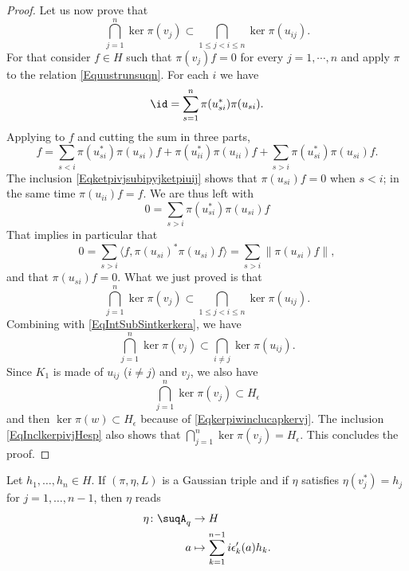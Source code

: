 \begin{proof}
    Let us now prove that
    \begin{equation}
        \bigcap_{j=1}^n\ker\pi(v_j)\subset\bigcap_{1\leq j<i\leq n}\ker\pi(u_{ij}).
    \end{equation}
    For that consider $f\in H$ such that $\pi(v_j)f=0$ for every $j=1,\cdots,n$ and apply $\pi$ to the relation \eqref{Equustrunsuqn}. For each $i$ we have
    \begin{equation}
        \id=\sum_{s=1}^n\pi(u_{si}^*)\pi(u_{si}).
    \end{equation}
    Applying to $f$ and cutting the sum in three parts,
    \begin{equation}
        f=\sum_{s<i}\pi(u_{si}^*)\pi(u_{si})f+\pi(u_{ii}^*)\pi(u_{ii})f+\sum_{s>i}\pi(u_{si}^*)\pi(u_{si})f.
    \end{equation}
    The inclusion \eqref{Eqketpivjsubipyjketpiuij} shows that $\pi(u_{si})f=0$ when $s<i$; in the same time $\pi(u_{ii})f=f$. We are thus left with
    \begin{equation}
        0=\sum_{s>i}\pi(u_{si}^*)\pi(u_{si})f
    \end{equation}
    That implies in particular that
    \begin{equation}
        0=\sum_{s>i}\langle f, \pi(u_{si})^*\pi(u_{si})f\rangle =\sum_{s>i}\| \pi(u_{si})f \|,
    \end{equation}
    and that $\pi(u_{si})f=0$. What we just proved is that
    \begin{equation}
        \bigcap_{j=1}^n\ker\pi(v_j)\subset\bigcap_{1\leq j<i\leq n}\ker\pi(u_{ij}).
    \end{equation}
    Combining with \eqref{EqIntSubSintkerkera}, we have
    \begin{equation}
        \bigcap_{j=1}^n\ker\pi(v_j)\subset\bigcap_{i\neq j}\ker\pi(u_{ij}).
    \end{equation}
    Since $K_1$ is made of $u_{ij}$ ($i\neq j$) and $v_j$, we also have
    \begin{equation}        \label{EqInclkerpivjHesp}
        \bigcap_{j=1}^n\ker\pi(v_j)\subset H_{\epsilon}
    \end{equation}
    and then $\ker \pi(w)\subset H_{\epsilon}$ because of \eqref{Eqkerpiwinclucapkervj}. The inclusion \eqref{EqInclkerpivjHesp} also shows that $\bigcap_{j=1}^n\ker\pi(v_j)=H_{\epsilon}$. This concludes the proof.
\end{proof}

\begin{proposition}
    Let $h_1,\ldots,h_n\in H$. If $(\pi,\eta,L)$ is a Gaussian triple and if $\eta$ satisfies $\eta(v_j^*)=h_j$ for $j=1,\ldots,n-1$, then $\eta$ reads
    \begin{equation}        \label{EqDefEtaCocyGaussU}
        \begin{aligned}
            \eta\colon \suqA_q&\to H \\
            a&\mapsto \sum_{k=1}^{n-1}i\epsilon_k'(a)h_k.
        \end{aligned}
    \end{equation}
\end{proposition}

